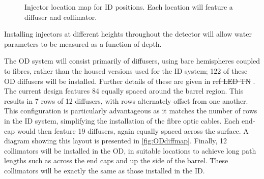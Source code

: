 \documentclass[a4paper,11pt]{article}
\providecommand{\DIFaddtex}[1]{{\protect\color{blue}\uwave{#1}}} %
\providecommand{\DIFdeltex}[1]{{\protect\color{red}\sout{#1}}}                      %
\providecommand{\DIFaddbegin}{} %
\providecommand{\DIFaddend}{} %
\providecommand{\DIFdelbegin}{} %
\providecommand{\DIFdelend}{} %
\providecommand{\DIFadd}[1]{\texorpdfstring{\DIFaddtex{#1}}{#1}} %
\providecommand{\DIFdel}[1]{\texorpdfstring{\DIFdeltex{#1}}{}} %
\newcommand{\DIFscaledelfig}{0.5}
\newlength{\DIFdelgraphicswidth} %
\newlength{\DIFdelgraphicsheight} %
\newcommand{\DIFaddincludegraphics}[2][]{{\color{blue}\fbox{\DIFOincludegraphics[#1]{#2}}}} %
\newcommand{\DIFdelincludegraphics}[2][]{%
\sbox{\DIFdelgraphicsbox}{\DIFOincludegraphics[#1]{#2}}%
\settoboxwidth{\DIFdelgraphicswidth}{\DIFdelgraphicsbox} %
\settoboxtotalheight{\DIFdelgraphicsheight}{\DIFdelgraphicsbox} %
\scalebox{\DIFscaledelfig}{%
\parbox[b]{\DIFdelgraphicswidth}{\usebox{\DIFdelgraphicsbox}\\[-\baselineskip] \rule{\DIFdelgraphicswidth}{0em}}\llap{\resizebox{\DIFdelgraphicswidth}{\DIFdelgraphicsheight}{%
\setlength{\unitlength}{\DIFdelgraphicswidth}%
\begin{picture}(1,1)%
\thicklines\linethickness{2pt} %
{\color[rgb]{1,0,0}\put(0,0){\framebox(1,1){}}}%
{\color[rgb]{1,0,0}\put(0,0){\line( 1,1){1}}}%
{\color[rgb]{1,0,0}\put(0,1){\line(1,-1){1}}}%
\end{picture}%
}\hspace*{3pt}}} %
} %
\DeclareRobustCommand{\DIFaddbegin}{\DIFOaddbegin \let\includegraphics\DIFaddincludegraphics} %
\DeclareRobustCommand{\DIFaddend}{\DIFOaddend \let\includegraphics\DIFOincludegraphics} %
\DeclareRobustCommand{\DIFdelbegin}{\DIFOdelbegin \let\includegraphics\DIFdelincludegraphics} %
\DeclareRobustCommand{\DIFdelend}{\DIFOaddend \let\includegraphics\DIFOincludegraphics} %
\begin{document}
\begin{figure}[h]
\caption{Injector location map for ID positions. Each location will feature a diffuser and collimator.}\label{fig:IDmap}
\end{figure}
Installing injectors at different heights throughout the detector will allow water parameters to be measured as a function of depth.

The OD system will consist primarily of diffusers, using bare hemispheres coupled to fibres, rather than the housed versions used for the ID system; 122 of these OD diffusers will be installed. Further details of these are given in \DIFdelbegin %
\DIFdel{ref LED TN}%
\DIFdelend \DIFaddbegin \DIFadd{\mbox{%
\cite{bib:tn0111}}\hskip0pt%
}\DIFaddend . The current design features 84 equally spaced around the barrel region. This results in 7 rows of 12 diffusers, with rows alternately offset from one another. This configuration is particularly advantageous as it matches the number of rows in the ID system, simplifying the installation of the fibre optic cables. Each end-cap would then feature 19 diffusers, again equally spaced across the surface. A diagram showing this layout is presented in \cref{fig:ODdiffmap}. Finally, 12 collimators will be installed in the OD, in suitable locations to achieve long path lengths such as across the end caps and up the side of the barrel. These collimators will be exactly the same as those installed in the ID.
\end{document}
